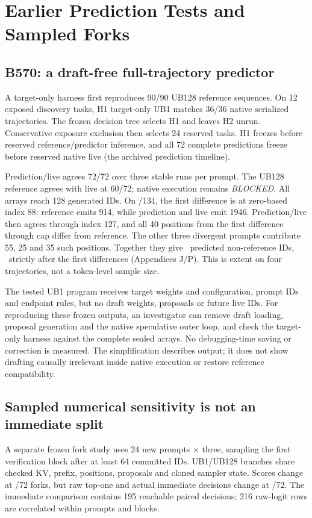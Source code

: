 \section{Earlier Prediction Tests and Sampled Forks}




\subsection{B570: a draft-free full-trajectory predictor}

A target-only harness first reproduces 90/90 UB128 reference sequences. On 12 exposed discovery tasks, H1 target-only UB1 matches 36/36 native serialized trajectories. The frozen decision tree selects H1 and leaves H2 unrun. Conservative exposure exclusion then selects 24 reserved tasks. H1 freezes before reserved reference/predictor inference, and all 72 complete predictions freeze before reserved native live (the archived prediction timeline).

Prediction/live agrees 72/72 over three stable runs per prompt. The UB128 reference agrees with live at 60/72; native execution remains \emph{BLOCKED}. All arrays reach 128 generated IDs. On /134, the first difference is at zero-based index 88: reference emits 914, while prediction and live emit 1946. Prediction/live then agrees through index 127, and all 40 positions from the first difference through cap differ from reference. The other three divergent prompts contribute 55, 25 and 35 such positions. Together they give \DiagBNonref\ predicted non-reference IDs, \DiagBAfter\ strictly after the first differences (Appendices J/P). This is extent on four trajectories, not a token-level sample size.

The tested UB1 program receives target weights and configuration, prompt IDs and endpoint rules, but no draft weights, proposals or future live IDs. For reproducing these frozen outputs, an investigator can remove draft loading, proposal generation and the native speculative outer loop, and check the target-only harness against the complete sealed arrays. No debugging-time saving or correction is measured. The simplification describes output; it does not show drafting causally irrelevant inside native execution or restore reference compatibility.

\subsection{Sampled numerical sensitivity is not an immediate split}
A separate frozen fork study uses 24 new prompts $\times$ three, sampling the first verification block after at least 64 committed IDs. UB1/UB128 branches share checked KV, prefix, positions, proposals and cloned sampler state. Scores change at \FUForkScores/72 forks, but raw top-one and actual immediate decisions change at \FUForkImmediate/72. The immediate comparison contains 195 reachable paired decisions; 216 raw-logit rows are correlated within prompts and blocks.

